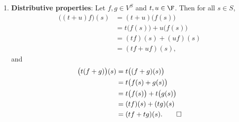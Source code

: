\begin{solution}
\begin{enumerate}[label=\arabic*)]
\item \textbf{Distributive properties}: Let $f,g\in V^S$ and $t,u\in\F$. Then
  for all $s\in S$,
  \begin{align*}
  \bigl((t+u)f\bigr)(s) &= (t+u)\bigl(f(s)\bigr)\\
    &= t\bigl(f(s)\bigr)+u\bigl(f(s)\bigr)\\
    &= (tf)(s)+(uf)(s)\\
    &= (tf+uf)(s),
  \end{align*}
  and
  \begin{align*}
  \bigl(t(f+g)\bigr)(s) &= t\bigl((f+g)(s)\bigr)\\
    &= t\bigl(f(s)+g(s)\bigr)\\
    &= t\bigl(f(s)\bigr)+t\bigl(g(s)\bigr)\\
    &= (tf)(s)+(tg)(s)\\
    &= (tf+tg)(s). \qedhere
  \end{align*}
\end{enumerate}
\end{solution}


